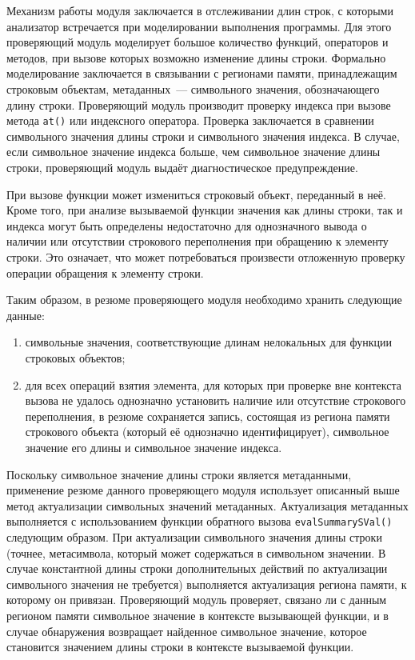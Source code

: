 Механизм работы модуля заключается в отслеживании длин строк, с которыми анализатор встречается при моделировании выполнения программы. Для этого проверяющий модуль моделирует большое количество функций, операторов и методов, при вызове которых возможно изменение длины строки. Формально моделирование заключается в связывании с регионами памяти, принадлежащим строковым объектам, метаданных~--- символьного значения, обозначающего длину строки. Проверяющий модуль производит проверку индекса при вызове метода \texttt{at()} или индексного оператора. Проверка заключается в сравнении символьного значения длины строки и символьного значения индекса. В случае, если символьное значение индекса больше, чем символьное значение длины строки, проверяющий модуль выдаёт диагностическое предупреждение.

При вызове функции может измениться строковый объект, переданный в неё. Кроме того, при анализе вызываемой функции значения как длины строки, так и индекса могут быть определены недостаточно для однозначного вывода о наличии или отсутствии строкового переполнения при обращению к элементу строки. Это означает, что может потребоваться произвести отложенную проверку операции обращения к элементу строки.

Таким образом, в резюме проверяющего модуля необходимо хранить следующие данные:

\begin{enumerate}
 \item символьные значения, соответствующие длинам нелокальных для функции строковых объектов;
 \item для всех операций взятия элемента, для которых при проверке вне контекста вызова не удалось однозначно установить наличие или отсутствие строкового переполнения, в резюме сохраняется запись, состоящая из региона памяти строкового объекта (который её однозначно идентифицирует), символьное значение его длины и символьное значение индекса.
\end{enumerate}

Поскольку символьное значение длины строки является метаданными, применение резюме данного проверяющего модуля использует описанный выше метод актуализации символьных значений метаданных. Актуализация метаданных выполняется с использованием функции обратного вызова \texttt{evalSummarySVal()} следующим образом. При актуализации символьного значения длины строки (точнее, метасимвола, который может содержаться в символьном значении. В случае константной длины строки дополнительных действий по актуализации символьного значения не требуется) выполняется актуализация региона памяти, к которому он привязан. Проверяющий модуль проверяет, связано ли с данным регионом памяти символьное значение в контексте вызывающей функции, и в случае обнаружения возвращает найденное символьное значение, которое становится значением длины строки в контексте вызываемой функции.


